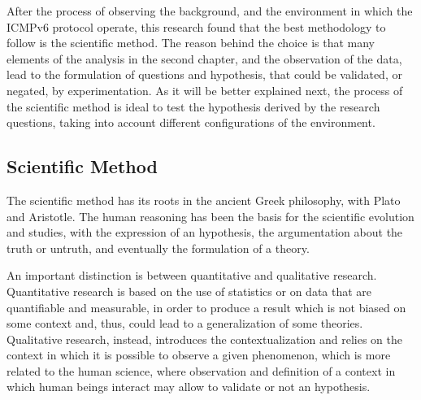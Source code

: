\documentclass[12pt]{article}
\begin{document}
After the process of observing the background, and the environment in which the ICMPv6 protocol operate, this research found that the best methodology to follow is the scientific method. The reason behind the choice is that many elements of the analysis in the second chapter, and the observation of the data, lead to the formulation of questions and hypothesis, that could be validated, or negated, by experimentation. As it will be better explained next, the process of the scientific method is ideal to test the hypothesis derived by the research questions, taking into account different configurations of the environment.

\subsection{Scientific Method}
\label{sub:sciMeth}

The scientific method has its roots in the ancient Greek philosophy, with Plato and Aristotle. The human reasoning has been the basis for the scientific evolution and studies, with the expression of an hypothesis, the argumentation about the truth or untruth, and eventually the formulation of a theory.\cite{carroll}

An important distinction is between quantitative and qualitative research. Quantitative research is based on the use of statistics or on data that are quantifiable and measurable, in order to produce a result which is not biased on some context and, thus, could lead to a generalization of some theories. Qualitative research, instead, introduces the contextualization and relies on the context in which it is possible to observe a given phenomenon, which is more related to the human science, where observation and definition of a context in which human beings interact may allow to validate or not an hypothesis.\cite{kaplan}
\end{document}
